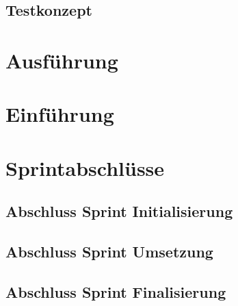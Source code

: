 \section{Testkonzept}

\chapter{Ausführung}



\chapter{Einführung}

\chapter{Sprintabschlüsse}

\section{Abschluss Sprint Initialisierung}

\section{Abschluss Sprint Umsetzung}

\section{Abschluss Sprint Finalisierung}


